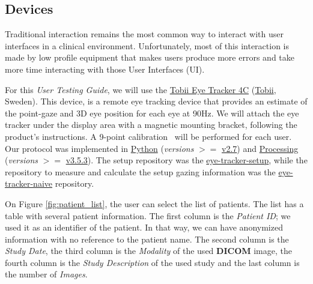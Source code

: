 
\subsection{Devices}

Traditional interaction remains the most common way to interact with user interfaces in a clinical environment. Unfortunately, most of this interaction is made by low profile equipment that makes users produce more errors and take more time interacting with those User Interfaces (UI).

For this \textit{User Testing Guide}, we will use the \hyperlink{https://gaming.tobii.com/product/tobii-eye-tracker-4c/}{Tobii Eye Tracker 4C} (\hyperlink{https://www.tobii.com/}{Tobii}, Sweden). This device, is a remote eye tracking device that provides an estimate of the point-gaze and 3D eye position for each eye at 90Hz. We will attach the eye tracker under the display area with a magnetic mounting bracket, following the product's instructions. A 9-point calibration~\cite{chatelain2018evaluation} will be performed for each user. Our protocol was implemented in \hyperlink{https://www.python.org/}{Python} (\textit{versions} $>=$ \hyperlink{https://docs.python.org/2/}{v2.7}) and \hyperlink{http://www.processing.org/}{Processing} (\textit{versions} $>=$ \hyperlink{https://github.com/processing/processing/releases/tag/processing-0269-3.5.3}{v3.5.3}). The setup repository was the \hyperlink{https://github.com/mida-project/eye-tracker-setup}{eye-tracker-setup}, while the repository to measure and calculate the setup gazing information was the \hyperlink{https://github.com/mida-project/eye-tracker-naive}{eye-tracker-naive} repository.

\clearpage

On Figure \ref{fig:patient_list}, the user can select the list of patients. The list has a table with several patient information. The first column is the \textit{Patient ID}; we used it as an identifier of the patient. In that way, we can have anonymized information with no reference to the patient name. The second column is the \textit{Study Date}, the third column is the \textit{Modality} of the used \textbf{DICOM} image, the fourth column is the \textit{Study Description} of the used study and the last column is the number of \textit{Images}.


